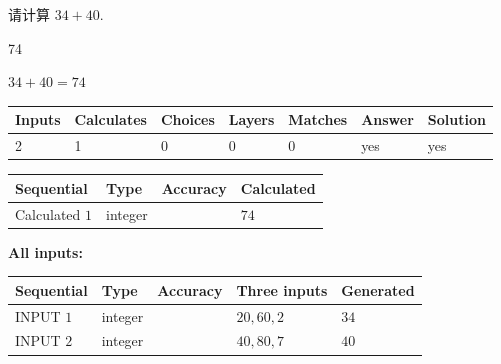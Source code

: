 \documentclass{ctexart}
\begin{document}
  
 
请计算 $ %
34 +  %
40 $.
 
 
 
\noindent{}
 
 

74
 
 
\noindent{}
 
 

 
 
 
\noindent{}
 
 

$ %
34 +  %
40=   %
74$
 
 
\noindent{}
 
 

 
   
   
   
   
\noindent\begin{tabular}{|l|l|l|l|l|l|l|}
 \hline
Inputs & Calculates & Choices & Layers & Matches & Answer & Solution \\ \hline
 2  & 
 1  & 
 0
  & 
 0  & 
 0  & 
  yes & 
  yes 
  \\ \hline
 \end{tabular}
   
   
   
   
\noindent{}
   
   
  
  
\noindent\begin{tabular}{|l|l|l|l|}
\hline
 Sequential & Type & Accuracy & Calculated \\ 
\hline
 
 
  Calculated $  1 $ & integer &  & 
  $ 74 $ 
 \\  \hline  
 \end{tabular}
   
   
   
   
\noindent\vspace{0.1in}\hspace{-0.08in} {\textbf{\Large{All inputs: }}}
   
   
  
  
\noindent\begin{tabular}{|l|l|l|l|l|}
\hline
 Sequential & Type & Accuracy & Three inputs & Generated \\ 
\hline
 
 
  INPUT $  1 $ & integer &  & $
 20
 , 
 60
 , 
 2
 $ & $ 34 $ 
 \\  \hline  
 
 
  INPUT $  2 $ & integer &  & $
 40
 , 
 80
 , 
 7
 $ & $ 40 $ 
 \\  \hline  
 \end{tabular}
   
\end{document}
